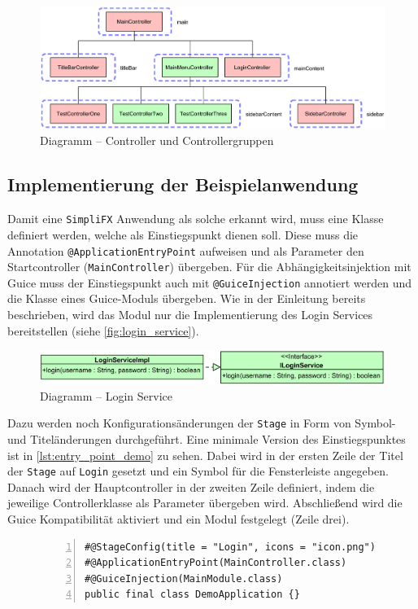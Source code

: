 \begin{figure}[H]
	\centering
	\includegraphics[width=\textwidth]{Abbildungen/Controller Relations.png}
	\caption{Diagramm -- Controller und Controllergruppen}
	\label{fig:controller_relations}
\end{figure}
\subsection{Implementierung der Beispielanwendung}
Damit eine \texttt{SimpliFX} Anwendung als solche erkannt wird, muss eine Klasse definiert werden, welche als Einstiegspunkt dienen soll. Diese muss die Annotation \texttt{@ApplicationEntryPoint} aufweisen und als Parameter den Startcontroller (\texttt{MainController}) übergeben. Für die Abhängigkeitsinjektion mit Guice muss der Einstiegspunkt auch mit \texttt{@GuiceInjection} annotiert werden und die Klasse eines Guice-Moduls übergeben. Wie in der Einleitung bereits beschrieben, wird das Modul nur die Implementierung des Login Services bereitstellen (siehe \autoref{fig:login_service}). 
\begin{figure}[H]
	\centering
	\includegraphics[width=\textwidth]{Abbildungen/Login Service.png}
	\caption{Diagramm -- Login Service}
	\label{fig:login_service}
\end{figure}
\noindent Dazu werden noch Konfigurationsänderungen der \texttt{Stage} in Form von Symbol- und Titeländerungen durchgeführt. Eine minimale Version des Einstiegspunktes ist in \autoref{lst:entry_point_demo} zu sehen. Dabei wird in der ersten Zeile der Titel der \texttt{Stage} auf \texttt{Login} gesetzt und ein Symbol für die Fensterleiste angegeben. Danach wird der Hauptcontroller in der zweiten Zeile definiert, indem die jeweilige Controllerklasse als Parameter übergeben wird. Abschließend wird die Guice Kompatibilität aktiviert und ein Modul festgelegt (Zeile drei).
\begin{figure}[H]
	\begin{lstlisting}[caption=Demo -- Minimaler Einstiegspunkt, captionpos=b, label=lst:entry_point_demo, numbers=left, xleftmargin=1.5em, framexleftmargin=1.5em]
#@StageConfig(title = "Login", icons = "icon.png")
#@ApplicationEntryPoint(MainController.class)
#@GuiceInjection(MainModule.class)
public final class DemoApplication {}
	\end{lstlisting}
\end{figure}
